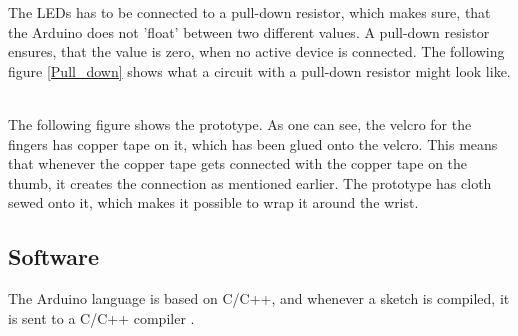 The LEDs has to be connected to a pull-down resistor\citep{Pull_down_res},
which makes sure, that the Arduino does not 'float' between two different values. A pull-down resistor ensures, that the value is zero, when no active device is connected.
The following figure \ref{Pull_down} shows what a circuit with a pull-down resistor might look like. \\


\begin{minipage}{\linewidth}%
\label{pull_down}
\end{minipage}\\

The following figure shows the prototype. As one can see, the velcro for the fingers has copper tape on it, which has been glued onto the velcro. 
This means that whenever the copper tape gets connected with the copper tape on the thumb, it creates the connection as mentioned earlier. 
The prototype has cloth sewed onto it, which makes it possible to wrap it around the wrist. 


\subsection{Software}

The Arduino language is based on C/C++, and whenever a sketch is compiled, it is sent to a C/C++ compiler \citep{Arduino_FAQ}.

